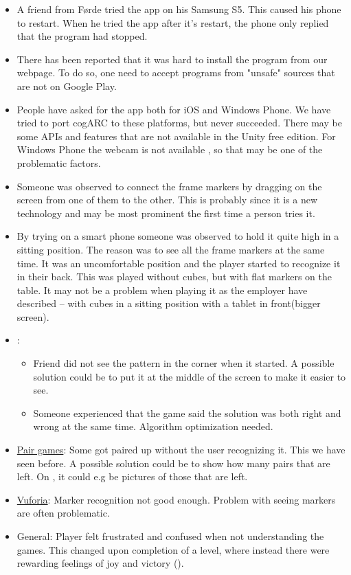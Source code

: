 \begin{itemize}
	\item A friend from F\o{}rde tried the app on his Samsung S5. This caused his phone to restart. When he tried the app after it's restart, the phone only replied that the program had stopped.
	\item There has been reported that it was hard to install the program from
	our webpage. To do so, one need to accept programs from "unsafe" sources
	that are not on Google Play.
	\item People have asked for the app both for iOS and Windows Phone. We have
	tried to port cogARC to these platforms, but never succeeded. There may be
	some APIs and features that are not available in the Unity free edition.
	For Windows Phone the webcam is not available
	\cite{GettingStartedWindowsPhoneBuildUnity}, so that may be one of the
	problematic factors.
	\item Someone was observed to connect the frame markers by dragging
	on the screen from one of them to the other. This is probably since it is a
	new technology and may be most prominent the first time a person tries it.
	\item By trying on a smart phone someone was observed to hold it quite high
	in a sitting position. The reason was to see all the frame markers at the 
	same time. It was an uncomfortable position and the player started to 
	recognize it in their back. This was played without cubes, but with flat
	markers on the table. It may not be a problem when playing it as the
	employer have described -- with cubes in a sitting position with a tablet
	in front(bigger screen).
	\vspace{8pt}
	\item {}:
		\vspace{-8pt}
		\begin{itemize}
			\item Friend did not see the pattern in the corner when it
			started. A possible solution could be to put it at the middle of
			the screen to make it easier to see.
			\item Someone experienced that the game said the solution was both
			right and wrong at the same time. Algorithm optimization needed.
		\end{itemize}
	\item \hyperref[fig:pair_games]{Pair games}: Some got paired up without the user recognizing it. This
	we have seen before. A possible solution could be to show how many
	pairs that are left. On , it could e.g be 
	pictures of those that are left.
	\item \hyperref[subsec:vuforia]{Vuforia}: Marker recognition not good
	enough. Problem with seeing	markers are often problematic.
	\item General: Player felt frustrated and confused when not understanding
	the games. This changed upon completion of a level, where instead there 
	were rewarding feelings of joy and victory ().
\end{itemize}